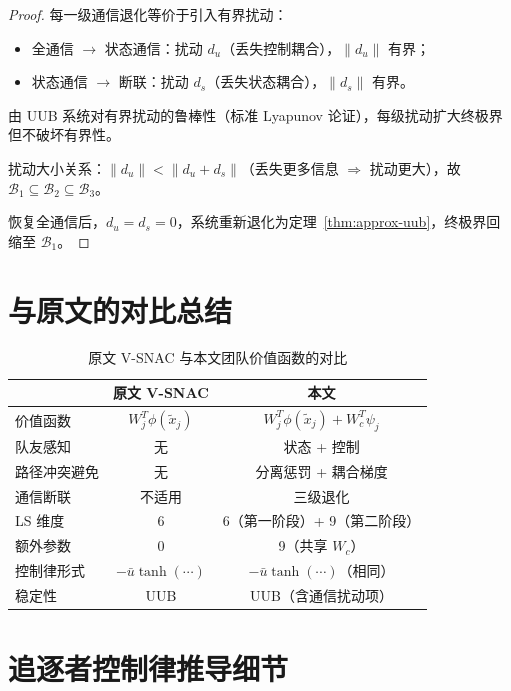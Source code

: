 \documentclass[12pt,a4paper]{ctexart}
\begin{document}
\begin{proof}
每一级通信退化等价于引入有界扰动：
\begin{itemize}
\item 全通信 $\to$ 状态通信：扰动 $d_u$（丢失控制耦合），$\|d_u\|$ 有界；
\item 状态通信 $\to$ 断联：扰动 $d_s$（丢失状态耦合），$\|d_s\|$ 有界。
\end{itemize}
由 UUB 系统对有界扰动的鲁棒性（标准 Lyapunov 论证），每级扰动扩大终极界但不破坏有界性。

扰动大小关系：$\|d_u\| < \|d_u + d_s\|$（丢失更多信息 $\Rightarrow$ 扰动更大），故 $\mathcal{B}_1 \subseteq \mathcal{B}_2 \subseteq \mathcal{B}_3$。

恢复全通信后，$d_u = d_s = 0$，系统重新退化为定理~\ref{thm:approx-uub}，终极界回缩至 $\mathcal{B}_1$。
\end{proof}


\section{与原文的对比总结}

\begin{table}[htbp]
\centering
\caption{原文 V-SNAC 与本文团队价值函数的对比}
\label{tab:comparison}
\begin{tabular}{@{}lcc@{}}
\toprule
& \textbf{原文 V-SNAC} & \textbf{本文} \\
\midrule
价值函数 & $W_j^T\phi(\tilde{x}_j)$ & $W_j^T\phi(\tilde{x}_j) + W_c^T\psi_j$ \\
队友感知 & 无 & 状态 + 控制 \\
路径冲突避免 & 无 & 分离惩罚 + 耦合梯度 \\
通信断联 & 不适用 & 三级退化 \\
LS 维度 & 6 & 6（第一阶段）+ 9（第二阶段） \\
额外参数 & 0 & 9（共享 $W_c$） \\
控制律形式 & $-\bar{u}\tanh(\cdots)$ & $-\bar{u}\tanh(\cdots)$（相同） \\
稳定性 & UUB & UUB（含通信扰动项） \\
\bottomrule
\end{tabular}
\end{table}


\appendix
\section{追逐者控制律推导细节}\label{app:control}
\end{document}
